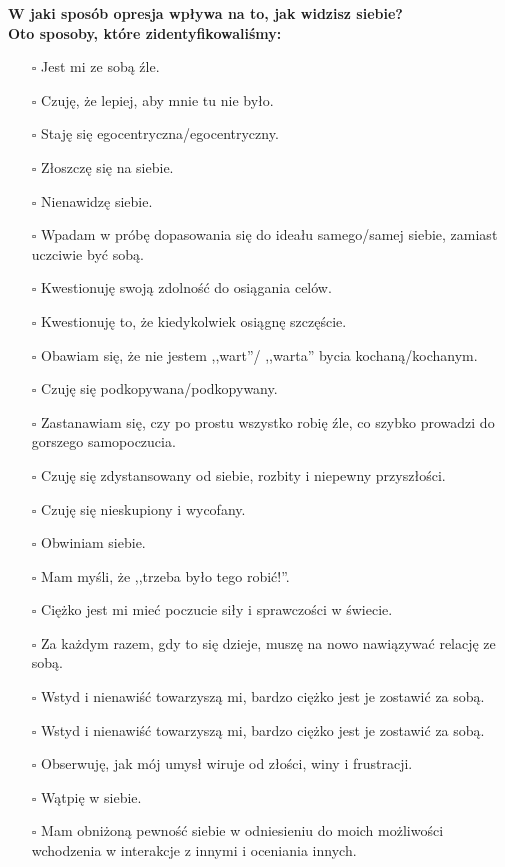 \noindent\textcolor{ProcessBlue}{\textbf{\Large{W jaki sposób opresja wpływa na to, jak widzisz siebie?}}}\\
\textbf{\large{Oto sposoby, które zidentyfikowaliśmy:}}
\begin{multicols}{2}
\begin{itemize}
\item[$\square$]{Jest mi ze sobą źle.}
\item[$\square$]{Czuję, że lepiej, aby mnie tu nie było.}
\item[$\square$]{Staję się egocentryczna/egocentryczny.}
\item[$\square$]{Złoszczę się na siebie.}
\item[$\square$]{Nienawidzę siebie.}
\item[$\square$]{Wpadam w próbę dopasowania się do ideału samego/samej siebie, zamiast uczciwie być sobą.}
\item[$\square$]{Kwestionuję swoją zdolność do osiągania celów.}
\item[$\square$]{Kwestionuję to, że kiedykolwiek osiągnę szczęście.}
\item[$\square$]{Obawiam się, że nie jestem ,,wart''/ ,,warta'' bycia kochaną/kochanym.}
\item[$\square$]{Czuję się podkopywana/podkopywany.}
\item[$\square$]{Zastanawiam się, czy po prostu wszystko robię źle, co szybko prowadzi do gorszego samopoczucia.}
\item[$\square$]{Czuję się zdystansowany od siebie, rozbity i niepewny przyszłości.}
\item[$\square$]{Czuję się nieskupiony i wycofany.}
\item[$\square$]{Obwiniam siebie.}
\item[$\square$]{Mam myśli, że ,,trzeba było tego robić!”.}
\item[$\square$]{Ciężko jest mi mieć poczucie siły i sprawczości w świecie.}
\item[$\square$]{Za każdym razem, gdy to się dzieje, muszę na nowo nawiązywać relację ze sobą.}
\item[$\square$]{Wstyd i nienawiść towarzyszą mi, bardzo ciężko jest je zostawić za sobą.}
\item[$\square$]{Wstyd i nienawiść towarzyszą mi, bardzo ciężko jest je zostawić za sobą.}
\item[$\square$]{Obserwuję, jak mój umysł wiruje od złości, winy i frustracji.}
\item[$\square$]{Wątpię w siebie.}
\item[$\square$]{Mam obniżoną pewność siebie w odniesieniu do moich możliwości wchodzenia w interakcje z innymi i oceniania innych.}

\end{itemize}
\end{multicols}
